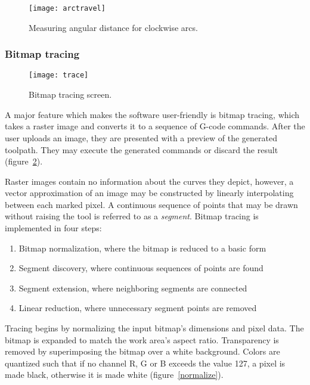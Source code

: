 \begin{figure}[ht]
    \begin{center}
        \texttt{[image: arctravel]}
        \caption{Measuring angular distance for clockwise arcs.}
        \label{arctravel}
    \end{center}
\end{figure}

\clearpage
\subsubsection{Bitmap tracing}

\begin{figure}[ht]
    \begin{center}
        \texttt{[image: trace]}
        \caption{Bitmap tracing screen.}
        \label{trace}
    \end{center}
\end{figure}

A major feature which makes the software user-friendly is bitmap tracing,
which takes a raster image and converts it to a sequence of G-code commands.
After the user uploads an image, they are presented with a preview of the
generated toolpath. They may execute the generated commands or discard the
result (figure~\ref{trace}).

Raster images contain no information about the curves they depict, however, a
vector approximation of an image may be constructed by linearly interpolating
between each marked pixel. A continuous sequence of points that may be drawn
without raising the tool is referred to as a \textit{segment}. Bitmap tracing
is implemented in four steps:
\begin{enumerate}
    \item Bitmap normalization, where the bitmap is reduced to a basic form
    \item Segment discovery, where continuous sequences of points are found
    \item Segment extension, where neighboring segments are connected
    \item Linear reduction, where unnecessary segment points are removed
\end{enumerate}

Tracing begins by normalizing the input bitmap's dimensions and pixel data. The
bitmap is expanded to match the work area's aspect ratio. Transparency is
removed by superimposing the bitmap over a white background. Colors are
quantized such that if no channel R, G or B exceeds the value 127, a pixel
is made black, otherwise it is made white (figure~\ref{normalize}).

